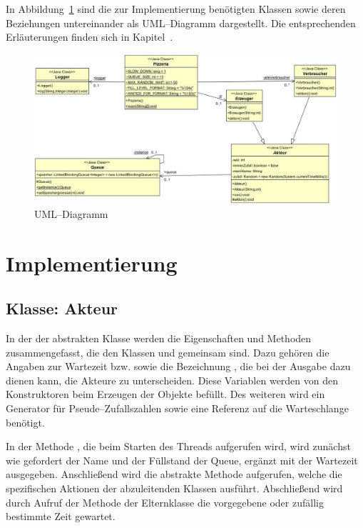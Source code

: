 In Abbildung~\ref{fig:epk} sind die zur Implementierung benötigten Klassen sowie deren Beziehungen untereinander als UML–Diagramm dargestellt. Die entsprechenden Erläuterungen finden sich in Kapitel~.

\label{sub:uml_diagramm}
\begin{figure}[H]
\begin{center}
\includegraphics[width=\textwidth]{UML.jpg}
\caption{UML–Diagramm}
\label{fig:epk}
\end{center}
\end{figure}


\newpage
\section{Implementierung} %
\label{sec:implementierung}

\subsection{Klasse: Akteur} %
\label{sub:klasse_akteur}
In der der abstrakten Klasse  werden die Eigenschaften und Methoden zusammengefasst, die den Klassen  und  gemeinsam sind. Dazu gehören die Angaben zur Wartezeit  bzw.  sowie die Bezeichnung , die bei der Ausgabe dazu dienen kann, die Akteure zu unterscheiden. Diese Variablen werden von den Konstruktoren beim Erzeugen der Objekte befüllt. Des weiteren wird ein Generator für Pseude–Zufallszahlen sowie eine Referenz auf die Warteschlange benötigt.

In der Methode , die beim Starten des Threads aufgerufen wird, wird zunächst wie gefordert der Name und der Füllstand der Queue, ergänzt mit der Wartezeit ausgegeben. Anschließend wird die abstrakte Methode  aufgerufen, welche die spezifischen Aktionen der abzuleitenden Klassen ausführt. Abschließend wird durch Aufruf der Methode  der Elternklasse  die vorgegebene oder zufällig bestimmte Zeit gewartet.

